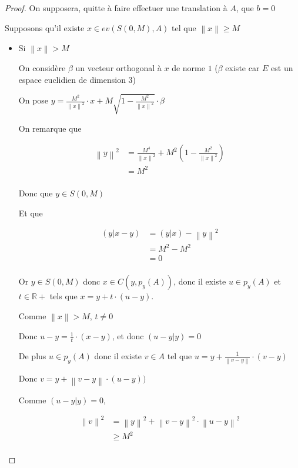 \documentclass[a4paper]{article}
\newcommand{\norm}[1]{\left\lVert#1\right\rVert}
\begin{document}
\begin{proof}

On supposera, quitte à faire effectuer une translation à $A$, que $b = 0$

Supposons qu'il existe $x \in ev(S(0,M), A)$ tel que $\norm{x} \geqslant M$

\begin{itemize}
\item Si $\norm{x} > M$ 

On considère $\beta$ un vecteur orthogonal à $x$ de norme $1$ ($\beta$ existe car $E$ est un espace euclidien de dimension $3$)

On pose $y = \frac{M^{2}}{\norm{x}^{2}} \cdot x + M \sqrt{1 - \frac{M^{2}}{\norm{x}^{2}}} \cdot \beta$

On remarque que 

\begin{align*}
\norm{y}^{2} &= \frac{M^{4}}{\norm{x}^{2}} + M^{2} (1 -\frac{M^{2}}{\norm{x}^{2}}) \\
             &= M^{2}\\
\end{align*}

Donc que $y \in S(0, M)$

Et que

\begin{align*}
(y|x - y) &= (y|x) - \norm{y}^{2}\\
          &= M^{2} - M^{2}\\
          &= 0\\
\end{align*}

Or $y \in S(0, M)$ donc $x \in C(y, p_{y}(A))$, donc il existe $u\in p_{y}(A)$ et $t\in \mathbb{R}+$ tels que $x = y + t \cdot (u - y)$.

Comme $\norm{x} > M$, $t\neq 0$

Donc $u - y = \frac{1}{t} \cdot (x - y)$, et donc $(u - y|y) = 0$

De plus $u \in p_{y}(A)$ donc il existe $v \in A$ tel que $u = y + \frac{1}{\norm{v -  y}} \cdot (v - y)$

Donc $v = y + \norm{v - y} \cdot (u - y))$

Comme $(u - y|y) = 0$,

\begin{align*}
\norm{v}^{2} &= \norm{y}^{2} + \norm{v - y}^{2} \cdot \norm{u - y}^{2} \\
             &\geqslant M^{2} \\
\end{align*}



\end{itemize}
\end{proof}
\end{document}
